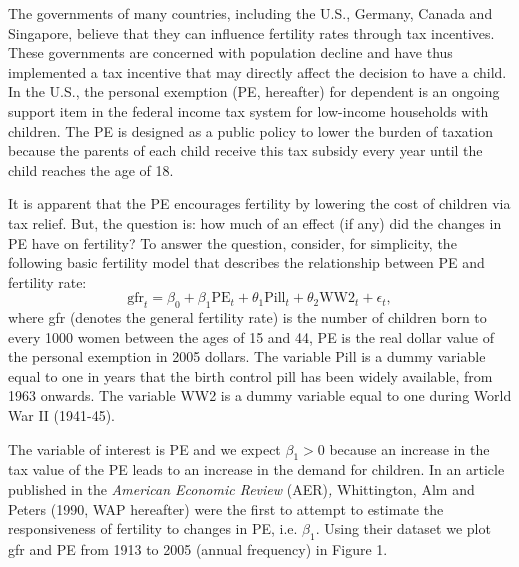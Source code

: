 \documentclass[12pt,a4paper]{article}
\begin{document}
The governments of many countries, including the U.S., Germany, Canada and
Singapore, believe that they can influence fertility rates through tax
incentives. These governments are concerned with population decline and have
thus implemented a tax incentive that may directly affect the decision to
have a child. In the U.S., the personal exemption (PE, hereafter) for
dependent is an ongoing support item in the federal income tax system for
low-income households with children. The PE is designed as a public policy to lower the burden of taxation because the parents of each child receive this tax subsidy every year until the child reaches the age of 18.

It is apparent that the PE encourages fertility by lowering the cost of
children via tax relief. But, the question is: how much of an effect (if
any) did the changes in PE have on fertility? To answer the question, consider, for simplicity, the
following basic fertility model that describes the relationship between PE
and fertility rate:%
\[
\text{gfr}_{t}=\beta _{0}+\beta _{1}\text{PE}_{t}+\theta _{1}\text{Pill}_{t}+\theta _{2}%
\text{WW2}_{t}+\epsilon _{t},
\]%
where gfr (denotes the general fertility rate) is the number of
children born to every 1000 women between the ages of 15 and 44, PE is the real
dollar value of the personal exemption in 2005 dollars. The variable Pill is a dummy
variable equal to one in years that the birth control pill has been widely
available, from 1963 onwards. The variable WW2 is a dummy variable equal to
one during World War II (1941-45). 

The variable of interest is PE and we expect $\beta _{1}>0$ because an
increase in the tax value of the PE leads to an increase in the demand for
children. In an article published in the \textit{American Economic Review }%
(AER)\textit{, }Whittington, Alm and Peters (1990, WAP hereafter)
were the first to attempt to estimate the responsiveness of fertility to
changes in PE, i.e. $\beta _{1}$. Using their dataset we plot gfr and PE
from 1913 to 2005 (annual frequency) in Figure 1.
\end{document}
